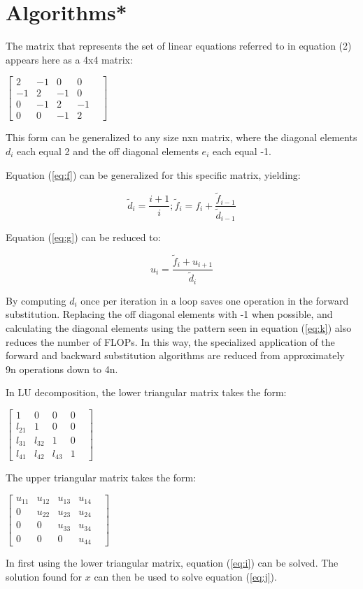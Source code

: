 \documentclass[10pt,showpacs,preprintnumbers,footinbib,amsmath,amssymb,aps,prl,twocolumn,groupedaddress,superscriptaddress,showkeys]{revtex4-1}
\begin{document}
\section{Algorithms*} \label{sec:algo}	

The matrix that represents the set of linear equations referred to in equation (2) appears here as a 4x4 matrix:
\begin{center}
		$\begin{bmatrix}
			2 & -1 & 0 & 0 \\
			-1 & 2 & -1 & 0 & \\
			0 & -1 & 2 & -1   \\
			0 & 0 & -1 & 2 
		\end{bmatrix}$
		 
		\end{center}
This form can be generalized to any size nxn matrix, where the diagonal elements $d_{i}$ each equal 2 and the off diagonal elements $e_{i}$ each equal -1.

Equation (\ref{eq:f})
 can be generalized for this specific matrix, yielding: 

	\begin{equation}
        \label{eq:k}
	\tilde{d}_{i}=\frac{i+1}{i};  
	\tilde{f}_{i}=f_{i}+\frac{\tilde{f}_{i-1}}{\tilde{d}_{i-1}}
	\end{equation}

Equation (\ref{eq:g})
 can be reduced to:

	\begin{equation}
	u_{i} = \frac{\tilde{f}_{i}+u_{i+1}}{\tilde{d}_{i}}
	\end{equation}

By computing $d_{i}$ once per iteration in a loop saves one operation in the forward substitution. Replacing the off diagonal elements with -1 when possible, and calculating the diagonal elements using the pattern seen in equation %
(\ref{eq:k}) also reduces the number of FLOPs. In this way, the specialized application of the forward and backward substitution algorithms are reduced from approximately 9n operations down to 4n.

In LU decomposition, the lower triangular matrix takes the form:
\begin{center}
$\begin{bmatrix}
			1 & 0 & 0 & 0 \\
			l_{21} & 1 & 0 & 0 & \\
			l_{31} &l_{32}& 1 & 0   \\
			l_{41}&l_{42}&l_{43}& 1 
\end{bmatrix}$
\end{center}
The upper triangular matrix takes the form:
\begin{center}
$\begin{bmatrix}
			u_{11}&u_{12}&u_{13}&u_{14}\\
			0 & u_{22} & u_{23}& u_{24} & \\
			0 & 0 & u_{33} & u_{34}   \\
			0 & 0 & 0 & u_{44}
\end{bmatrix}$
\end{center}
In first using the lower triangular matrix, equation (\ref{eq:i}) can be solved. The solution found for $x$ can then be used to solve equation (\ref{eq:j}).	
\end{document}

